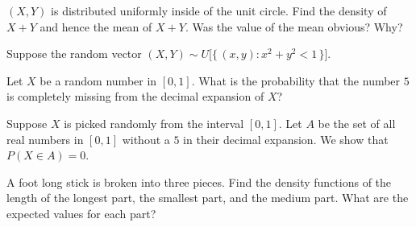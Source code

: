 \begin{problem}[Handout 18, \# 15]
  \((X,Y)\) is distributed uniformly inside of the unit circle. Find the
  density of \(X+Y\) and hence the mean of \(X+Y\). Was the value of the
  mean obvious? Why?
\end{problem}
\begin{solution}
  Suppose the random vector \((X,Y)\sim
  U\bigl[\{\,(x,y):x^2+y^2<1\,\}\bigr]\).
\end{solution}
\newpage

\begin{problem}[Handout 18, \# 16]
  Let \(X\) be a random number in \([0,1]\). What is the probability that
  the number \(5\) is completely missing from the decimal expansion of
  \(X\)?
\end{problem}
\begin{solution}
  Suppose \(X\) is picked randomly from the interval \([0,1]\). Let \(A\)
  be the set of all real numbers in \([0,1]\) without a \(5\) in their
  decimal expansion. We show that \(P(X\in A)=0\).
\end{solution}
\newpage

\begin{problem}[Handout 18, \# 17]
  A foot long stick is broken into three pieces. Find the density functions
  of the length of the longest part, the smallest part, and the medium
  part. What are the expected values for each part?
\end{problem}
\begin{solution}

\end{solution}

